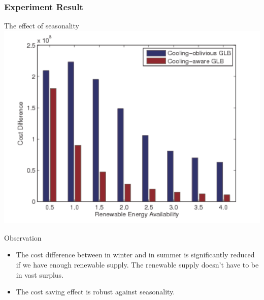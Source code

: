 \documentclass[xcolor=dvipsnames]{beamer}
\begin{document}
\begin{frame}
\frametitle{Experiment Result}
\begin{block}
{The effect of seasonality}
\includegraphics[scale = 0.38]{cost_diff.pdf}
\end{block}
\begin{block}
{Observation}
\begin{itemize}
\item
The cost difference between in winter and in summer is significantly reduced if we have enough renewable supply. The renewable supply doesn't have to be in vast surplus.
\item
The cost saving effect is robust against seasonality.
\end{itemize}
\end{block}
\end{frame}
%
%
\end{document}
